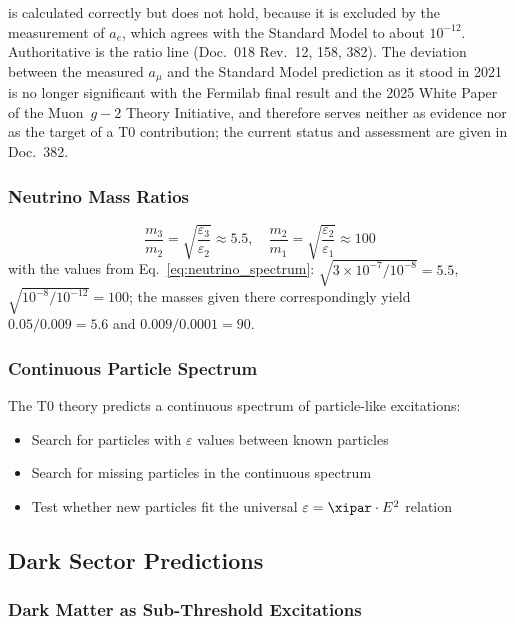 	is calculated correctly but does not hold, because it is excluded by the measurement of $a_e$, which agrees with the Standard Model to about $10^{-12}$. Authoritative is the ratio line (Doc.~018 Rev.~12, 158, 382). The deviation between the measured $a_\mu$ and the Standard Model prediction as it stood in 2021 is no longer significant with the Fermilab final result and the 2025 White Paper of the Muon~$g-2$ Theory Initiative, and therefore serves neither as evidence nor as the target of a T0 contribution; the current status and assessment are given in Doc.~382.
	
	\subsubsection{Neutrino Mass Ratios}
	
	\begin{equation}
		\frac{m_3}{m_2} = \sqrt{\frac{\varepsilon_3}{\varepsilon_2}} \approx 5.5, \quad \frac{m_2}{m_1} = \sqrt{\frac{\varepsilon_2}{\varepsilon_1}} \approx 100
		\label{eq:neutrino_mass_ratios}
	\end{equation}
	with the values from Eq.~\eqref{eq:neutrino_spectrum}: $\sqrt{3\times10^{-7}/10^{-8}} = 5.5$, $\sqrt{10^{-8}/10^{-12}} = 100$; the masses given there correspondingly yield $0.05/0.009 = 5.6$ and $0.009/0.0001 = 90$.
	
	\subsubsection{Continuous Particle Spectrum}
	
	The T0 theory predicts a continuous spectrum of particle-like excitations:
	
	\begin{itemize}
		\item Search for particles with $\varepsilon$ values between known particles
		\item Search for missing particles in the continuous spectrum
		\item Test whether new particles fit the universal $\varepsilon = \xipar \cdot E^2$ relation
	\end{itemize}
	
	\subsection{Dark Sector Predictions}
	
	\subsubsection{Dark Matter as Sub-Threshold Excitations}
	
